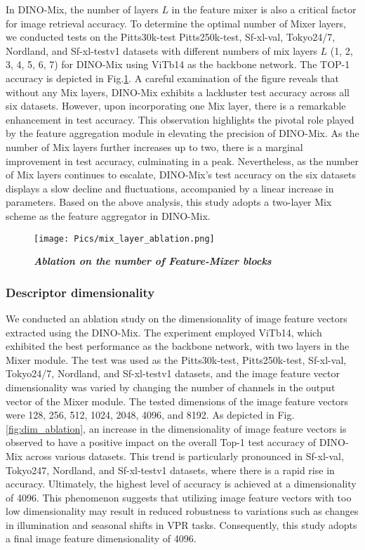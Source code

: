 In DINO-Mix, the number of layers $L$ in the feature mixer is also a critical factor for image retrieval accuracy. To determine the optimal number of Mixer layers, we conducted tests on the Pitts30k-test Pitts250k-test, Sf-xl-val, Tokyo24/7, Nordland, and Sf-xl-testv1 datasets with different numbers of mix layers $L$ (1, 2, 3, 4, 5, 6, 7) for DINO-Mix using ViTb14 as the backbone network. The TOP-1 accuracy is depicted in Fig.\ref{fig:mix_layer_ablatio}. A careful examination of the figure reveals that without any Mix layers, DINO-Mix exhibits a lackluster test accuracy across all six datasets. However, upon incorporating one Mix layer, there is a remarkable enhancement in test accuracy. This observation highlights the pivotal role played by the feature aggregation module in elevating the precision of DINO-Mix. As the number of Mix layers further increases up to two, there is a marginal improvement in test accuracy, culminating in a peak. Nevertheless, as the number of Mix layers continues to escalate, DINO-Mix's test accuracy on the six datasets displays a slow decline and fluctuations, accompanied by a linear increase in parameters. Based on the above analysis, this study adopts a two-layer Mix scheme as the feature aggregator in DINO-Mix.
    

    \begin{figure}[!t]
    \renewcommand{\thefigure}{5} 
        \centering
        \texttt{[image: Pics/mix\_layer\_ablation.png]}
        \vspace{-1em}
        \caption{\emph{\textbf{Ablation on the number of Feature-Mixer blocks}}}
        \label{fig:mix_layer_ablatio}
    \end{figure}

    
\subsubsection{Descriptor dimensionality}

We conducted an ablation study on the dimensionality of image feature vectors extracted using the DINO-Mix. The experiment employed ViTb14, which exhibited the best performance as the backbone network, with two layers in the Mixer module. The test was used as the Pitts30k-test, Pitts250k-test, Sf-xl-val, Tokyo24/7, Nordland, and Sf-xl-testv1 datasets, and the image feature vector dimensionality was varied by changing the number of channels in the output vector of the Mixer module. The tested dimensions of the image feature vectors were 128, 256, 512, 1024, 2048, 4096, and 8192. As depicted in Fig.\ref{fig:dim_ablation}, an increase in the dimensionality of image feature vectors is observed to have a positive impact on the overall Top-1 test accuracy of DINO-Mix across various datasets. This trend is particularly pronounced in Sf-xl-val, Tokyo247, Nordland, and Sf-xl-testv1 datasets, where there is a rapid rise in accuracy. Ultimately, the highest level of accuracy is achieved at a dimensionality of 4096. This phenomenon suggests that utilizing image feature vectors with too low dimensionality may result in reduced robustness to variations such as changes in illumination and seasonal shifts in VPR tasks. Consequently, this study adopts a final image feature dimensionality of 4096.


